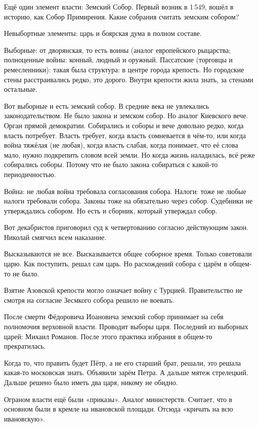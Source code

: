 Ещё один элемент власти: Земский Собор. Первый возник в 1\,549, вошёл в историю, как Собор Примирения. Какие собрания считать земским собором?

Невыбортные элементы: царь и боярская дума в полном составе.

Выборные: от дворянская, то есть воины (аналог европейского рыцарства; полноценные войны: конный, людный и оружный. Пассатские (торговцы и ремесленники): такая была структура: в центре города крепость. Но городские стены расстраивались редко, это дорого. Внутри крепости жила знать, за стенами остальные.

Вот выборные и есть земский собор. 
В средние века не увлекались законодательством. Не было закона и земском собор. Но аналог Киевского вече. Орган прямой демократии. Собирались и соборы и вече довольно редко, когда власть потребует. Власть требует, когда власть сомневается в чём-то, или когда война тяжёлая (не любая), когда власть слабая, когда понимает, что её слова мало, нужно подкрепить словом всей земли.
Но когда жизнь наладилась, всё реже собирались соборы. Потому что не было закона собираться с какой-то периодичностью.

Война: не любая война требовала согласования собора. Налоги: тоже не любые налоги требовали собора. Законы тоже на обязательно через собор. Судебники не утверждались собором. Но есть и сборник, который утверждал собор.

Вот декабристов приговорил суд к четвертованию согласно действующим закон. Николай смягчил всем наказание.

Высказываются не все. Высказывается общее соборное время. Только советовали царю. Как поступить, решал сам царь. Но расхождений собора с царём в общем-то не было.

Взятие Азовской крепости могло означает войну с Турцией. Правительство не смотря на согласие Зесмкого собора решило не воевать.

После смерти Фёдоровича Иоановича земский собор принимает на себя полномочия верховной власти. Проводит выборы царя. Последний из выборных царей: Михаил Романов. После этого практика избрания в общем-то прекратилась.

Когда то, что править будет Пётр, а не его старший брат, решали, это решала какая-то московская знать. Объявили зарём Петра. А дальше мятеж стрелецкий. Дальше решено было иметь два царя, никому не обидно.

Ограном власти ещё были «приказы». Аналог министерств. Считает, что в основном были в кремле на ивановской площади. Отсюда «кричать на всю ивановскую».


